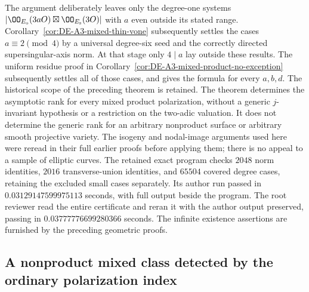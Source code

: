 \begin{remark}
\label{rem:DE-A3-mixed-product-scope}
The argument deliberately leaves only the degree-one systems
$|\OO_{E_{\rm o}}(3aO)\boxtimes\OO_{E_{\rm s}}(3O)|$ with
$a$ even outside its stated range.
Corollary~\ref{cor:DE-A3-mixed-thin-vone} subsequently settles
the cases $a\equiv2\pmod4$ by a universal degree-six seed and
the correctly directed supersingular-axis norm.
At that stage only $4\mid a$ lay outside these results.
The uniform residue proof in
Corollary~\ref{cor:DE-A3-mixed-product-no-exception} subsequently
settles all of those cases, and gives the formula for every $a,b,d$.
The historical scope of the preceding theorem is retained.
The theorem determines the asymptotic
rank for every mixed product polarization, without a generic
$j$-invariant hypothesis or a restriction on the two-adic valuation.
It does not determine the generic rank for an arbitrary
nonproduct surface or arbitrary smooth projective variety.
The isogeny and nodal-image arguments used here were reread in
their full earlier proofs before applying them; there is no
appeal to a sample of elliptic curves.
The retained exact program
checks $2048$ norm identities, $2016$ transverse-union identities,
and $65504$ covered degree cases, retaining the excluded small cases
separately.  Its author run passed in $0.03129147599975113$ seconds,
with full output beside the program.  The root reviewer read the entire
certificate and reran it with the author output preserved, passing in
$0.03777776699280366$ seconds.  The infinite existence assertions
are furnished by the preceding geometric proofs.
\end{remark}


\subsection{A nonproduct mixed class detected by the ordinary polarization index}
\label{sec:DE-A3-mixed-nonproduct}

